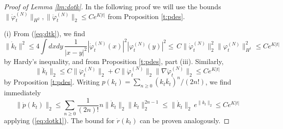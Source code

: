 \documentclass[11pt,a4paper]{article}
\newcommand{\di}{{d}}		%
\newcommand{\norm}[1]{\lVert#1\rVert}	%
\newcommand{\ph}{\varphi_t^{(N)}}	%
\newcommand{\phdot}{\dot{\varphi}_t^{(N)}}	%
\begin{document}
\begin{proof}[Proof of Lemma \ref{lm:dotk}]
In the following proof we will use the bounds $\| \dot{\varphi}_t^{(N)} \|_{H^2} , \| \ddot{\varphi}_t^{(N)} \|_2 \leq C e^{K|t|}$ from Proposition \ref{t:pdes}. 

(i) {F}rom (\ref{eq:dtk}), we find
\begin{equation}\label{eq:dotk1}\norm{\dot k_t}^2 \leq 4 \int \di x\di y\, \frac{1}{|x-y|^2}  |\phdot(x)|^2 |\ph(y)|^2 \leq \, C\| \phdot \|_2^2 \| \ph \|_{H^1}^2 \leq C e^{K |t|} \end{equation}
by Hardy's inequality, and from Proposition \ref{t:pdes}, part (iii). Similarly, 
\[ \| \ddot k_t \|_2 \leq C \| \ddot \varphi_t^{(N)} \|_2 + C \| \dot \varphi_t^{(N)} \|_2 \| \nabla \dot \varphi_t^{(N)} \|_2 \leq C e^{K |t|} \]
by Proposition \ref{t:pdes}. Writing $p (k_t) = \sum_{n \geq 0} (k_t \overline{k}_t)^n / (2n!)$, we find immediately
\[ \| \dot p (k_t) \|_2 \leq \sum_{n \geq 0} \frac{1}{(2n)!} n \| \dot k_t \|_2 \| k_t \|_2^{2n-1} \leq \| \dot k_t \|_2 \, e^{ \|k_t \|_2} \leq C e^{K |t|} \]
applying (\ref{eq:dotk1}). The bound for $\dot r (k_t)$ can be proven analogously. 


\end{proof}
\end{document}
